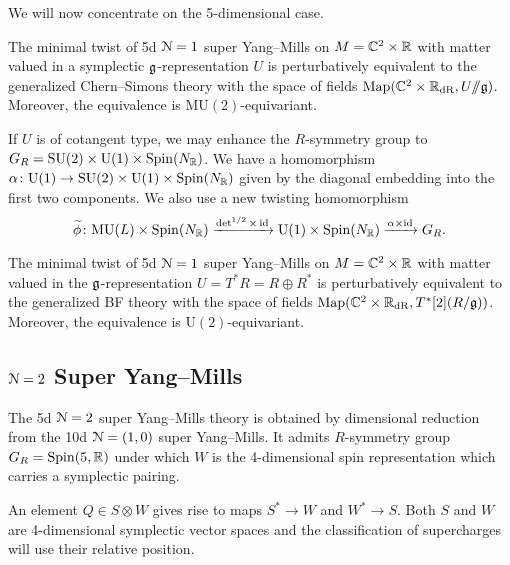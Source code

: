 \documentclass[10pt, oneside]{article}
\newcommand{\MU}{\mathrm{MU}}
\renewcommand{\U}{\mathrm{U}}
\newcommand{\ham}{/\!\!/}
\begin{document}
We will now concentrate on the 5-dimensional case.

\begin{theorem}
The minimal twist of 5d $\mathcal N=1$ super Yang--Mills on $M=\mathbb C^2\times \mathbb R$ with matter valued in a symplectic $\mathfrak g$-representation $U$ is perturbatively equivalent to the generalized Chern--Simons theory with the space of fields $\map(\CC^2\times \RR_{\mathrm{dR}}, U\ham \fg)$. Moreover, the equivalence is $\MU(2)$-equivariant.
\label{thm:5dminimaltwist}
\end{theorem}

If $U$ is of cotangent type, we may enhance the $R$-symmetry group to $G_R=\SU(2)\times \U(1)\times \Spin(N_\RR)$. We have a homomorphism $\alpha\colon \U(1)\rightarrow \SU(2)\times \U(1)\times \Spin(N_\RR)$ given by the diagonal embedding into the first two components. We also use a new twisting homomorphism
\[\wt\phi\colon \MU(L)\times \Spin(N_\RR)\xrightarrow{\det^{1/2}\times \id}\U(1)\times \Spin(N_\RR)\xrightarrow{\alpha\times\id}G_R.\]

\begin{theorem}
The minimal twist of 5d $\mathcal N=1$ super Yang--Mills on $M=\mathbb C^2\times \mathbb R$ with matter valued in the $\mathfrak g$-representation $U=T^* R=R\oplus R^*$ is perturbatively equivalent to the generalized BF theory with the space of fields $\operatorname{Map}(\mathbb C^2\times \mathbb R_{\mathrm{dR}}, T^*[2] (R/\mathfrak g))$. Moreover, the equivalence is $\U(2)$-equivariant.
\label{thm:5dminimaltwistgraded}
\end{theorem}

\subsection{\texorpdfstring{$\mathcal{N} = 2$}{N=2} Super Yang--Mills} \label{5d_2_section}

The 5d $\mathcal N=2$ super Yang--Mills theory is obtained by dimensional reduction from the 10d $\mathcal N=(1, 0)$ super Yang--Mills. It admits $R$-symmetry group $G_R=\mathrm{Spin}(5, \mathbb R)$ under which $W$ is the 4-dimensional spin representation which carries a symplectic pairing.

An element $Q\in S\otimes W$ gives rise to maps $S^*\rightarrow W$ and $W^*\rightarrow S$. Both $S$ and $W$ are 4-dimensional symplectic vector spaces and the classification of supercharges will use their relative position.
\end{document}

